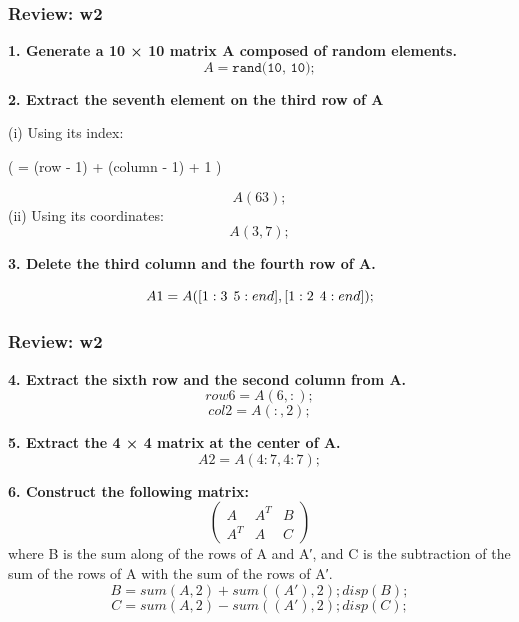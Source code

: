 \documentclass[
	11pt, %
]{beamer}
\begin{document}

\begin{frame}
	\frametitle{Review: w2}

	\textbf{1. Generate a 10 × 10 matrix A composed of random elements.}
\[
A = \texttt{rand(10, 10)};
\]

\textbf{2. Extract the seventh element on the third row of A}

(i) Using its index:

 (  = (row - 1) + (column - 1) \times {} + 1 )
 
\[
A(63);
\]
(ii) Using its coordinates:
\[
A(3, 7);
\]

\textbf{3. Delete the third column and the fourth row of A.}

\[
A1 = A([1:3 \hspace{0.15cm} 5:end],[1:2 \hspace{0.15cm} 4:end]);
\]


\end{frame}



\begin{frame}
	\frametitle{Review: w2}

	\textbf{4. Extract the sixth row and the second column from A.}
\[
row6 = A(6,:); 
\]
\[
col2 = A(:,2);
\]


\textbf{5. Extract the 4 × 4 matrix at the center of A.}
\[
A2 = A(4:7,4:7);
\]


\textbf{6. Construct the following matrix:}
\[
\begin{pmatrix}
A & A^T & B \\
A^T & A & C
\end{pmatrix}
\]
where B is the sum along of the rows of A and A′, and C is the subtraction of the sum of the rows of A with the sum of the rows of A′.
    \[
    B = sum(A,2)+sum((A'),2); disp(B); \]
    \[C = sum(A,2)-sum((A'),2); disp(C); \]


\end{frame}

\end{document}
